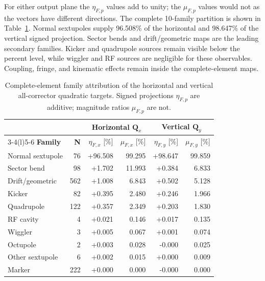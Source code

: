 \documentclass[letterpaper]{jacow}
\begin{document}
For either output plane the $\eta_{F,p}$ values add to unity; the
$\mu_{F,p}$ values would not as the vectors have different directions.
The complete 10-family partition is shown in
Table~\ref{tab:element-families}. Normal sextupoles supply 96.508\% of the
horizontal and 98.647\% of the vertical signed projection. Sector bends and
drift/geometric maps are the leading secondary families. Kicker and
quadrupole sources remain visible below the percent level, while wiggler and
RF sources are negligible for these observables. Coupling, fringe, and
kinematic effects remain inside the complete-element maps.

\begin{table}[!t]
  \centering
  \scriptsize
  \setlength{\tabcolsep}{2.2pt}
  \begin{tabular}{@{}lrrrrr@{}}
    \toprule
    & & \multicolumn{2}{c}{Horizontal $\bm Q_x$}
        & \multicolumn{2}{c}{Vertical $\bm Q_y$} \\
    \cmidrule(lr){3-4}\cmidrule(l){5-6}
    \textbf{Family} & \textbf{N}
      & $\eta_{F,x}$ [\%] & $\mu_{F,x}$ [\%]
      & $\eta_{F,y}$ [\%] & $\mu_{F,y}$ [\%] \\
    \midrule
    Normal sextupole & 76  & +96.508 & 99.295 & +98.647 & 99.859 \\
    Sector bend      & 98  &  +1.702 & 11.993 &  +0.384 &  6.833 \\
    Drift/geometric  & 562 &  +1.008 &  6.843 &  +0.502 &  5.128 \\
    Kicker           & 82  &  +0.395 &  2.480 &  +0.246 &  1.966 \\
    Quadrupole       & 122 &  +0.357 &  2.349 &  +0.203 &  1.830 \\
    RF cavity        & 4   &  +0.021 &  0.146 &  +0.017 &  0.135 \\
    Wiggler          & 3   &  +0.005 &  0.067 &  +0.001 &  0.074 \\
    Octupole         & 2   &  +0.003 &  0.028 &  -0.000 &  0.025 \\
    Other sextupole  & 6   &  +0.002 &  0.015 &  +0.000 &  0.009 \\
    Marker           & 222 &  +0.000 &  0.000 &  -0.000 &  0.000 \\
    \bottomrule
  \end{tabular}
  \caption{Complete-element family attribution of the horizontal and vertical
  all-corrector quadratic targets.  Signed projections $\eta_{F,p}$ are
  additive; magnitude ratios $\mu_{F,p}$ are not.}
  \label{tab:element-families}
\end{table}
\end{document}
